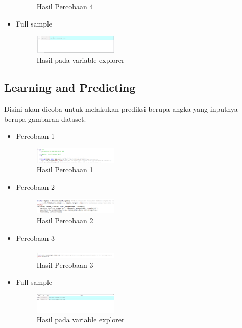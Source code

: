 \begin{itemize}
\begin{figure}[H]
		\centering
		\caption{Hasil Percobaan 4}
	\end{figure}
	\item Full sample \hfill \break 
	\begin{figure}[H]
		\includegraphics[width=4cm]{figures/1174035/chapter1/2_var.png}
		\centering
		\caption{Hasil pada variable explorer}
	\end{figure}
\end{itemize}
\subsection{Learning and Predicting}
Disini akan dicoba untuk melakukan prediksi berupa angka yang inputnya berupa gambaran dataset. 
\begin{itemize}
	\item Percobaan 1  \hfill \break 
	\begin{figure}[H]
		\includegraphics[width=4cm]{figures/1174035/chapter1/3_1_hasil.png}
		\centering
		\caption{Hasil Percobaan 1}
	\end{figure}
	\item Percobaan 2 \hfill \break 
	\begin{figure}[H]
		\includegraphics[width=4cm]{figures/1174035/chapter1/3_2_hasil.png}
		\centering
		\caption{Hasil Percobaan 2}
	\end{figure}
	\item Percobaan 3  \hfill \break 
	\begin{figure}[H]
		\includegraphics[width=4cm]{figures/1174035/chapter1/3_3_hasil.png}
		\centering
		\caption{Hasil Percobaan 3}
	\end{figure}
	\item Full sample \hfill \break 
	\begin{figure}[H]
		\includegraphics[width=4cm]{figures/1174035/chapter1/3_var.png}
		\centering
		\caption{Hasil pada variable explorer}
	\end{figure}
\end{itemize}
